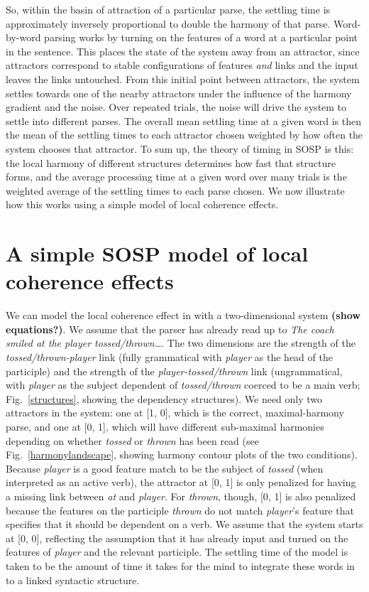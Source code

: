 \documentclass[10pt,letterpaper]{article}
\begin{document}
So, within the basin of attraction of a particular parse, the settling time is approximately inversely proportional to double the harmony of that parse. Word-by-word parsing works by turning on the features of a word at a particular point in the sentence. This places the state of the system away from an attractor, since attractors correspond to stable configurations of features \emph{and} links and the input leaves the links untouched. From this initial point between attractors, the system settles towards one of the nearby attractors under the influence of the harmony gradient and the noise. Over repeated trials, the noise will drive the system to settle into different parses. The overall mean settling time at a given word is then the mean of the settling times to each attractor chosen weighted by how often the system chooses that attractor. To sum up, the theory of timing in SOSP is this: the local harmony of different structures determines how fast that structure forms, and the average processing time at a given word over many trials is the weighted average of the settling times to each parse chosen. We now illustrate how this works using a simple model of local coherence effects.

\section{A simple SOSP model of local coherence effects}
We can model the local coherence effect in  with a two-dimensional system \textbf{(show equations?)}. We assume that the parser has already read up to \emph{The coach smiled at the player tossed/thrown\dots}. The two dimensions are the strength of the \emph{tossed/thrown-player} link (fully grammatical with \emph{player} as the head of the participle) and the strength of the \emph{player-tossed/thrown} link (ungrammatical, with \emph{player} as the subject dependent of \emph{tossed/thrown} coerced to be a main verb; Fig.~\ref{structures}, showing the dependency structures). We need only two attractors in the system: one at [1, 0], which is the correct, maximal-harmony parse, and one at [0, 1], which will have different sub-maximal harmonies depending on whether \emph{tossed} or \emph{thrown} has been read (see Fig.~\ref{harmonylandscape}, showing harmony contour plots of the two conditions). Because \emph{player} is a good feature match to be the subject of \emph{tossed} (when interpreted as an active verb), the attractor at [0, 1] is only penalized for having a missing link between \emph{at} and \emph{player}. For \emph{thrown}, though, [0, 1] is also penalized because the features on the participle \emph{thrown} do not match \emph{player}'s feature that specifies that it should be dependent on a verb. We assume that the system starts at [0, 0], reflecting the assumption that it has already input and turned on the features of \emph{player} and the relevant participle. The settling time of the model is taken to be the amount of time it takes for the mind to integrate these words in to a linked syntactic structure.
\end{document}
